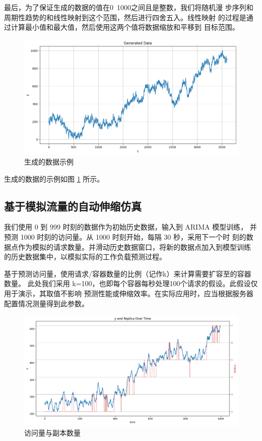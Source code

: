 \documentclass[a4paper,AutoFakeBold,oneside,12pt]{book}
\begin{document}
最后，为了保证生成的数据的值在0~1000之间且是整数，我们将随机漫
步序列和周期性趋势的和线性映射到这个范围，然后进行四舍五入。线性映射
的过程是通过计算最小值和最大值，然后使用这两个值将数据缩放和平移到
目标范围。

\begin{figure}[htbp]
	\centering
	\includegraphics[width=1.0\textwidth]{images/generated_data.png}
	\caption{生成的数据示例}
	\label{fig:generated_data}
  \end{figure}

生成的数据的示例如图 \ref{fig:generated_data} 所示。

\subsection{基于模拟流量的自动伸缩仿真}

我们使用 0 到 999 时刻的数据作为初始历史数据，输入到 ARIMA 模型训练，
并预测 1000 时刻的访问量。从 1000 时刻开始，每隔 30 秒，采用下一个时
刻的数据点作为模拟的请求数量。并滑动历史数据窗口，将新的数据点加入到模型训练
的历史数据集中，以模拟实际的工作负载预测过程。

基于预测访问量，使用请求/容器数量的比例（记作k）来计算需要扩容至的容器数量。
此处我们采用 k=100，也即每个容器每秒处理100个请求的假设。此假设仅用于演示，其取值不影响
预测性能或伸缩效率。在实际应用时，应当根据服务器配置情况测量得到此参数。

\begin{figure}[htbp]
	\centering
	\includegraphics[width=1.0\textwidth]{images/y_replica.png}
	\caption{访问量与副本数量}
	\label{fig:y_replica}
  \end{figure}
\end{document}
